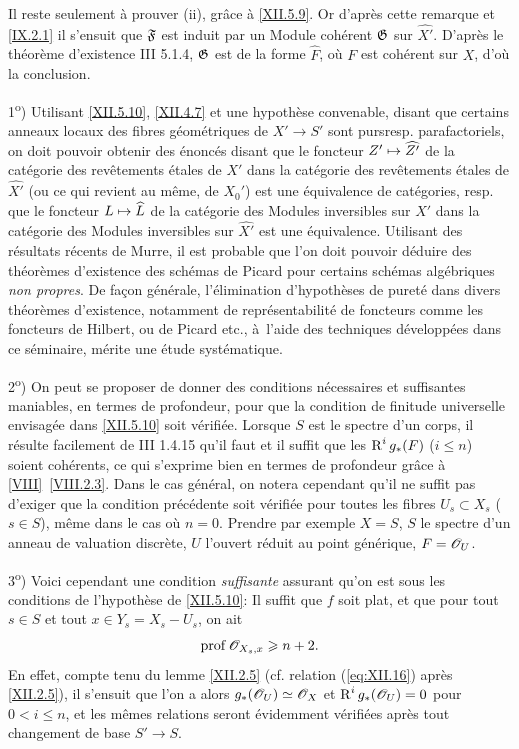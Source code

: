 Il reste seulement \`a prouver (ii), gr\^ace \`a \ref{XII.5.9}. Or d'apr\`es cette remarque et \ref{IX.2.1} il s'ensuit que $\mathfrak{F}$ est induit par un Module coh\'erent $\mathfrak{G}$ sur $\widehat{X'}$. D'apr\`es le th\'eor\`eme d'existence \EGA III 5.1.4, $\mathfrak{G}$ est de la forme $\widehat{F}$, o\`u $F$ est coh\'erent sur $X$, d'o\`u la conclusion.

\begin{remarques} \label{XII.5.11}
1\textsuperscript{o}) Utilisant \ref{XII.5.10}, \ref{XII.4.7} et une hypoth\`ese convenable, disant que certains anneaux locaux des fibres g\'eom\'etriques de $X'\to S'$ sont \og purs\fg resp. parafactoriels, on doit pouvoir obtenir des \'enonc\'es disant que le foncteur $Z'\mto \widehat{Z'}$ de la cat\'egorie des rev\^etements \'etales de $X'$ dans la cat\'egorie des rev\^etements \'etales de $\widehat{X'}$ (ou ce qui revient au m\^eme, de $X_0'$) est une \'equivalence de cat\'egories, resp. que le foncteur $L\mto \widehat{L}$ de la cat\'egorie des Modules inversibles sur $X'$ dans la cat\'egorie des Modules inversibles sur $\widehat{X'}$ est une \'equivalence. Utilisant des r\'esultats r\'ecents de Murre, il est probable que l'on doit pouvoir d\'eduire des th\'eor\`emes d'existence des sch\'emas de Picard pour certains sch\'emas alg\'ebriques \emph{non propres}. De fa\c con g\'en\'erale, l'\'elimination d'hypoth\`eses de puret\'e dans divers th\'eor\`emes d'existence, notamment de repr\'esentabilit\'e de foncteurs comme les foncteurs de Hilbert, ou de Picard etc., \`a~l'aide des techniques d\'evelopp\'ees dans ce s\'eminaire, m\'erite une \'etude syst\'ematique.

2\textsuperscript{o}) On peut se proposer de donner des conditions n\'ecessaires et suffisantes maniables, en termes de profondeur, pour que la condition de finitude universelle envisag\'ee dans \ref{XII.5.10} soit v\'erifi\'ee. Lorsque $S$ est le spectre d'un corps, il r\'esulte facilement de \EGA III 1.4.15 qu'il faut et il suffit que les $\operatorname{R}^ig_\ast(F)$ ($i\leq n$) soient coh\'erents, ce qui s'exprime bien en termes de profondeur gr\^ace \`a \ref{VIII}~\ref{VIII.2.3}. Dans le cas g\'en\'eral, on notera cependant qu'il ne suffit pas d'exiger que la condition pr\'ec\'edente soit v\'erifi\'ee pour toutes les fibres $U_s\subset X_s$ ($s\in S$), m\^eme dans le cas o\`u $n=0$. Prendre par exemple $X=S$, $S$ le spectre d'un anneau de valuation discr\`ete, $U$ l'ouvert r\'eduit au point g\'en\'erique, $F={\mathscr O}_U$.

3\textsuperscript{o}) Voici cependant une condition \emph{suffisante} assurant qu'on est sous les conditions de l'hypoth\`ese de \ref{XII.5.10}: Il suffit que $f$ soit plat, et que pour tout $s\in S$ et tout $x\in Y_s=X_s- U_s$, on ait
\[
\operatorname{prof} {\mathscr O}_{X_s, x}\geqslant n+2.
\]
En effet, compte tenu du lemme \ref{XII.2.5} (cf. relation (\ref{eq:XII.16}) apr\`es \ref{XII.2.5}), il s'ensuit que l'on a alors $g_\ast({\mathscr O}_U)\simeq\mathscr{O}_X$ et $\operatorname{R}^ig_\ast({\mathscr O}_U)=0$ pour $0<i\leq n$, et les m\^emes relations seront \'evidemment v\'erifi\'ees apr\`es tout changement de base $S'\to S$.
\end{remarques}


